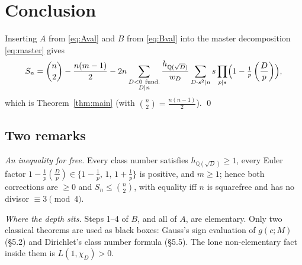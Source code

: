 \documentclass[11pt]{article}
\newcommand{\leg}[2]{\left(\frac{#1}{#2}\right)}
\begin{document}
\section{Conclusion}

Inserting $A$ from \eqref{eq:Aval} and $B$ from \eqref{eq:Bval} into the master decomposition
\eqref{eq:master} gives
\[
S_n=\binom n2-\frac{n(m-1)}{2}
-2n\sum_{\substack{D<0\ \text{fund.}\\ D\mid n}}\frac{h_{\mathbb{Q}(\sqrt D)}}{w_D}\sum_{D\cdot s^2\mid n}s\prod_{p\mid s}\Bigl(1-\tfrac1p\leg Dp\Bigr),
\]
which is Theorem~\ref{thm:main} (with $\binom n2=\frac{n(n-1)}2$). \qed

\subsection*{Two remarks}
\emph{An inequality for free.} Every class number satisfies $h_{\mathbb{Q}(\sqrt D)}\ge1$, every Euler factor
$1-\tfrac1p\leg Dp\in\{1-\tfrac1p,\,1,\,1+\tfrac1p\}$ is positive, and $m\ge1$; hence both corrections are
$\ge0$ and $S_n\le\binom n2$, with equality iff $n$ is squarefree and has no divisor $\equiv3\pmod4$.

\emph{Where the depth sits.} Steps 1--4 of $B$, and all of $A$, are elementary. Only two classical theorems are
used as black boxes: Gauss's sign evaluation of $g(c;M)$ (\S5.2) and Dirichlet's class number formula
(\S5.5). The lone non-elementary fact inside them is $L(1,\chi_D)>0$.
\end{document}
